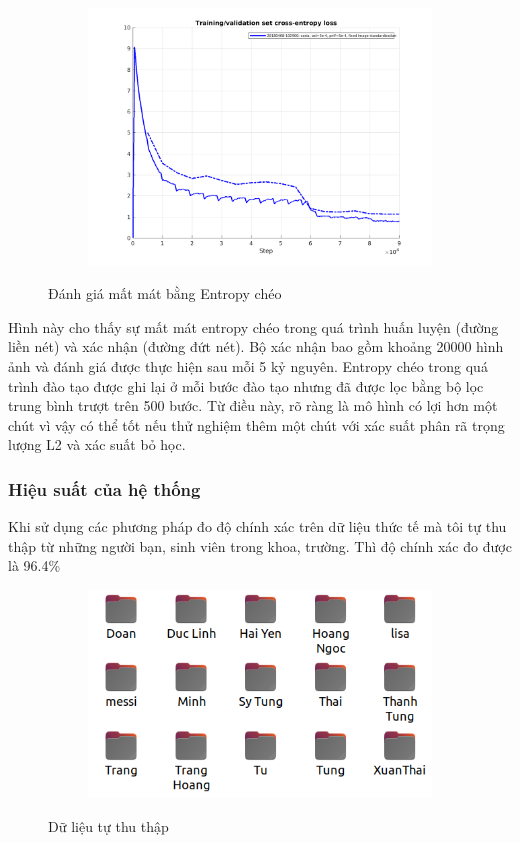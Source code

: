 \begin{figure}
    \begin{subfigure}{1\textwidth}
        \includegraphics[width=1\linewidth]{Chapters/items/validate.png}
        \label{fig:validate}
    \end{subfigure}
    \caption{Đánh giá mất mát bằng Entropy chéo}
\end{figure}
\newpage
Hình này cho thấy sự mất mát entropy chéo trong quá trình huấn luyện (đường liền nét) và xác nhận (đường đứt nét). Bộ xác nhận bao gồm khoảng 20000 hình ảnh và đánh giá được thực hiện sau mỗi 5 kỷ nguyên. Entropy chéo trong quá trình đào tạo được ghi lại ở mỗi bước đào tạo nhưng đã được lọc bằng bộ lọc trung bình trượt trên 500 bước. Từ điều này, rõ ràng là mô hình có lợi hơn một chút vì vậy có thể tốt nếu thử nghiệm thêm một chút với xác suất phân rã trọng lượng L2 và xác suất bỏ học.

\newpage
\subsubsection{Hiệu suất của hệ thống}

Khi sử dụng các phương pháp đo độ chính xác trên dữ liệu thức tế mà tôi tự thu thập từ
những người bạn, sinh viên trong khoa, trường. Thì độ chính xác đo được là 96.4\%

\begin{figure}
    \begin{subfigure}{0.6\textwidth}
        \includegraphics[width=1.0\linewidth]{Chapters/items/dataset.png}
        \label{fig:dataset}
    \end{subfigure}
    \caption{Dữ liệu tự thu thập}
\end{figure}
